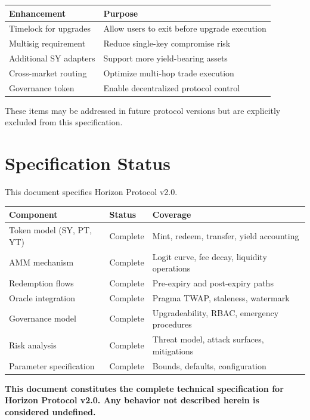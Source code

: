 \begin{center}
\begin{tabular}{l l}
\toprule
\textbf{Enhancement} & \textbf{Purpose} \\
\midrule
Timelock for upgrades & Allow users to exit before upgrade execution \\
Multisig requirement & Reduce single-key compromise risk \\
Additional SY adapters & Support more yield-bearing assets \\
Cross-market routing & Optimize multi-hop trade execution \\
Governance token & Enable decentralized protocol control \\
\bottomrule
\end{tabular}
\end{center}

These items may be addressed in future protocol versions but are explicitly excluded from this specification.


\section{Specification Status}

This document specifies Horizon Protocol v2.0.

\begin{center}
\begin{tabular}{l l l}
\toprule
\textbf{Component} & \textbf{Status} & \textbf{Coverage} \\
\midrule
Token model (SY, PT, YT) & Complete & Mint, redeem, transfer, yield accounting \\
AMM mechanism & Complete & Logit curve, fee decay, liquidity operations \\
Redemption flows & Complete & Pre-expiry and post-expiry paths \\
Oracle integration & Complete & Pragma TWAP, staleness, watermark \\
Governance model & Complete & Upgradeability, RBAC, emergency procedures \\
Risk analysis & Complete & Threat model, attack surfaces, mitigations \\
Parameter specification & Complete & Bounds, defaults, configuration \\
\bottomrule
\end{tabular}
\end{center}

\vspace{1em}

\noindent\textbf{This document constitutes the complete technical specification for Horizon Protocol v2.0. Any behavior not described herein is considered undefined.}

